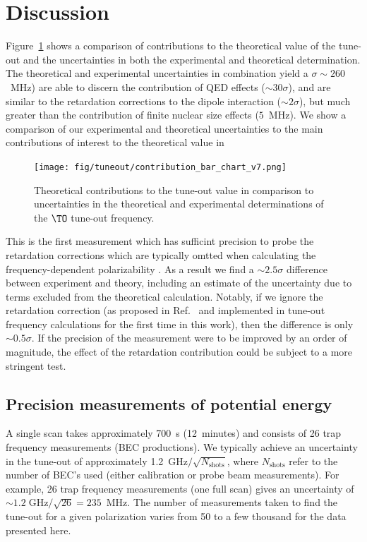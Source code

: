 \section{Discussion}
	Figure~\ref{fig:contributions} shows a comparison of contributions to the theoretical value of the tune-out and the uncertainties in both the experimental and theoretical determination.
	The theoretical and experimental uncertainties in combination yield a  \(\sigma{\sim} 260\)~MHz) are able to discern the contribution of QED effects (\({\sim} 30 \sigma\)), and are similar to the retardation corrections to the dipole interaction (\({\sim} 2 \sigma\)), but much greater than the contribution of finite nuclear size effects (\(5\)~MHz). 
	We show a comparison of our experimental and theoretical uncertainties to the main contributions of interest to the theoretical value in 
	 
	\begin{figure}[t]
	    \centering
	    \texttt{[image: fig/tuneout/contribution\_bar\_chart\_v7.png]}
	    \caption{Theoretical contributions to the tune-out value in comparison to uncertainties in the theoretical and experimental determinations of the \(\TO\) tune-out frequency.}
	    \label{fig:contributions}
	\end{figure}

	This is the first measurement which has sufficint precision to probe  the retardation corrections which are typically omtted when calculating the frequency-dependent polarizability \cite{Drake19, Pachucki19}. 
	As a result we find a \({\sim} 2.5 \sigma\) difference between experiment and theory, including an estimate of the uncertainty due to terms excluded from the theoretical calculation.  
	Notably, if we ignore the retardation correction (as proposed in Ref.~\cite{Pachucki19} and implemented in tune-out frequency calculations for the first time in this work), then the difference is only \({\sim} 0.5 \sigma\).  
	If the precision of the measurement were to be  improved by an order of magnitude, the effect of the retardation contribution could be subject to a more stringent test.


\subsection{Precision measurements of potential energy}

	A single scan takes approximately 700~s (12~minutes) and consists of 26 trap frequency measurements (BEC productions). We typically achieve an uncertainty in the tune-out of approximately 1.2~$\text{GHz}/\sqrt{N_\text{shots}}$, where \(N_\text{shots}\) refer to the number of BEC's used (either calibration or probe beam measurements). For example, 26 trap frequency measurements (one full scan) gives an uncertainty of $\sim 1.2\;\mathrm{GHz}/\sqrt{26}=235$~MHz. The number of measurements taken to find the tune-out for a given polarization varies from 50 to a few thousand for the data presented here.

